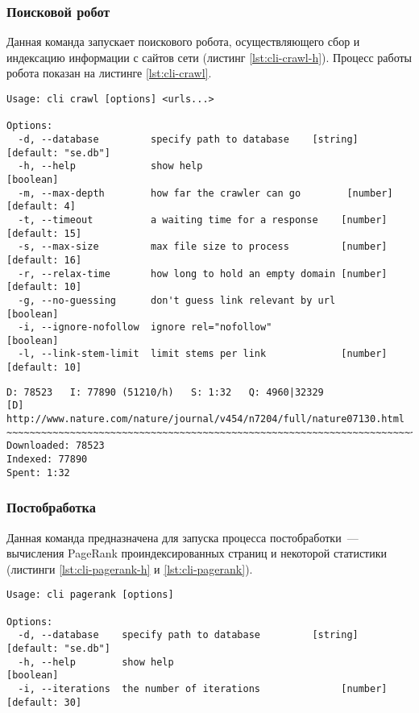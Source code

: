 \subsubsection*{Поисковой робот}
Данная команда запускает поискового робота, осуществляющего сбор и индексацию информации с сайтов сети (листинг \ref{lst:cli-crawl-h}). Процесс работы робота показан на листинге \ref{lst:cli-crawl}.
\begin{lstlisting}[caption=Интерфейс командной строки: поисковой робот., label=lst:cli-crawl-h]
Usage: cli crawl [options] <urls...>

Options:
  -d, --database         specify path to database    [string] [default: "se.db"]
  -h, --help             show help                                     [boolean]
  -m, --max-depth        how far the crawler can go        [number] [default: 4]
  -t, --timeout          a waiting time for a response    [number] [default: 15]
  -s, --max-size         max file size to process         [number] [default: 16]
  -r, --relax-time       how long to hold an empty domain [number] [default: 10]
  -g, --no-guessing      don't guess link relevant by url              [boolean]
  -i, --ignore-nofollow  ignore rel="nofollow"                         [boolean]
  -l, --link-stem-limit  limit stems per link             [number] [default: 10]
\end{lstlisting}

\begin{lstlisting}[caption=Интерфейс командной строки: поисковой робот., label=lst:cli-crawl]
D: 78523   I: 77890 (51210/h)   S: 1:32   Q: 4960|32329
[D] http://www.nature.com/nature/journal/v454/n7204/full/nature07130.html
~~~~~~~~~~~~~~~~~~~~~~~~~~~~~~~~~~~~~~~~~~~~~~~~~~~~~~~~~~~~~~~~~~~~~~~~~~~~~~
Downloaded: 78523
Indexed: 77890
Spent: 1:32
\end{lstlisting}


\subsubsection*{Постобработка}
Данная команда предназначена для запуска процесса постобработки~--- вычисления PageRank проиндексированных страниц и некоторой статистики (листинги \ref{lst:cli-pagerank-h} и \ref{lst:cli-pagerank}).
\begin{lstlisting}[caption=Интерфейс командной строки: постобработка., label=lst:cli-pagerank-h]
Usage: cli pagerank [options]

Options:
  -d, --database    specify path to database         [string] [default: "se.db"]
  -h, --help        show help                                          [boolean]
  -i, --iterations  the number of iterations              [number] [default: 30]
\end{lstlisting}

